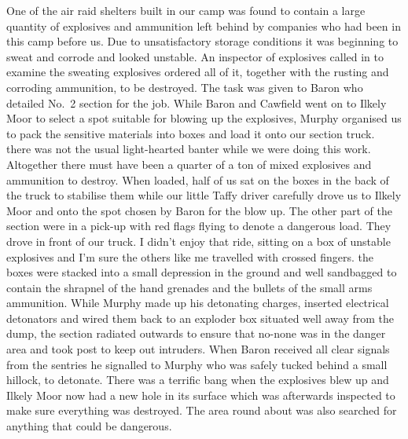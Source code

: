 One of the air raid shelters built in our camp was found to contain a
large quantity of explosives and ammunition left behind by companies
who had been in this camp before us. Due to unsatisfactory storage
conditions it was beginning to sweat and corrode and looked unstable.
An inspector of explosives called in to examine the sweating
explosives ordered all of it, together with the rusting and corroding
ammunition, to be destroyed. The task was given to \lieutenant Baron
who detailed No.~2 section for the job. While \lieutenant Baron and
\sergeant Cawfield went on to Ilkely Moor to select a spot suitable for
blowing up the explosives, \corporal Murphy organised us to pack the
sensitive materials into boxes and load it onto our section truck.
there was not the usual light-hearted banter while we were doing this
work. Altogether there must have been a quarter of a ton of
mixed explosives and ammunition to destroy. When loaded, half of us
sat on the boxes in the back of the truck to stabilise them while our
little Taffy driver carefully drove us to Ilkely Moor and onto the
spot chosen by \lieutenant Baron for the blow up. The other part of
the section were in a pick-up with red flags flying to denote a
dangerous load. They drove in front of our truck. I didn't enjoy
that ride, sitting on a box of unstable explosives and I'm sure the
others like me travelled with crossed fingers. the boxes were stacked
into a small depression in the ground and well sandbagged to contain
the shrapnel of the hand grenades and the bullets of the small arms
ammunition. While \corporal Murphy made up his detonating charges,
inserted electrical detonators and wired them back to an exploder box
situated well away from the dump, the section radiated outwards to
ensure that no-none was in the danger area and took post to keep out
intruders. When \lieutenant Baron received all clear signals from the
sentries he signalled to \corporal Murphy who was safely tucked behind
a small hillock, to detonate. There was a terrific bang when the
explosives blew up and Ilkely Moor now had a new hole in its surface
which was afterwards inspected to make sure everything was destroyed.
The area round about was also searched for anything that could be
dangerous.

